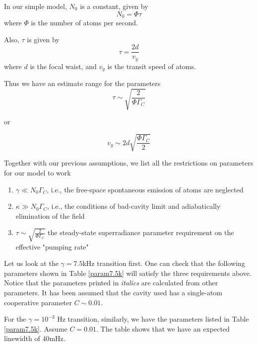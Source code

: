 \documentclass{article}
\newcommand{\gc}{\Gamma_C}
\begin{document}
In our simple model, $N_0$ is a constant, given by 
\begin{equation}
    N_0=\Phi\tau
\end{equation}
where $\Phi$ is the number of atoms per second.

Also, $\tau$ is given by 
\begin{equation}
    \tau = \frac{2d}{v_y}
\end{equation}
where $d$ is the focal waist, and $v_y$ is the transit speed of atoms.

Thus we have an estimate range for the parameters
\begin{equation}
    \tau \sim \sqrt{\frac{2}{\Phi \gc}}
\end{equation}

or

\begin{equation}
    v_y \sim 2d\sqrt{\frac{\Phi \gc}{2}}
\end{equation}

Together with our previous assumptions, we list all the restrictions on parameters for our model to work
\begin{enumerate}
    \item $\gamma \ll N_0 \gc$, i.e., the free-space spontaneous emission of atoms are neglected
    \item $\kappa \gg N_0 \gc$, i.e., the conditions of bad-cavity limit and adiabatically elimination of the field
    \item $\tau \sim \sqrt{\frac{2}{\Phi \gc}}$ the steady-state superradiance parameter requirement on the effective "pumping rate"
\end{enumerate}

Let us look at the $\gamma = 7.5$kHz transition first. One can check that the following parameters shown in Table \ref{param7.5k} will satisfy the three requirements above. Notice that the parameters printed in \textit{italics} are calculated from other parameters. It has been assumed that the cavity used has a single-atom cooperative parameter $C \sim 0.01$.

For the $\gamma=10^{-3}$ Hz transition, similarly, we have the parameters listed in Table \ref{param7.5k}. Assume $C=0.01$. The table shows that we have an expected linewidth of 40mHz.
\end{document}
